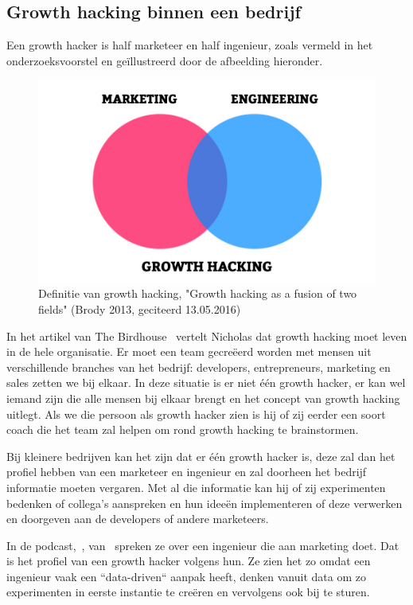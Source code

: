 \subsection{Growth hacking binnen een bedrijf} \label{sec:growth-hacker-functie}
Een growth hacker is half marketeer en half ingenieur, zoals vermeld in het onderzoeksvoorstel en geïllustreerd door de afbeelding hieronder.
\begin{figure}[h!]
	\includegraphics[width=\linewidth]{img/growth-hacker-definition.jpg}
	\centering
	\caption{Definitie van growth hacking, "Growth hacking as a fusion of two fields"  (Brody 2013, geciteerd 13.05.2016)}
	\label{fig:defGrowthHacker}
\end{figure}

In het artikel van The Birdhouse~ vertelt Nicholas dat growth hacking moet leven in de hele organisatie. Er moet een team gecreëerd worden met mensen uit verschillende branches van het bedrijf: developers, entrepreneurs, marketing en sales zetten we bij elkaar. In deze situatie is er niet één growth hacker, er kan wel iemand zijn die alle mensen bij elkaar brengt en het concept van growth hacking uitlegt. Als we die persoon als growth hacker zien is hij of zij eerder een soort coach die het team zal helpen om rond growth hacking te brainstormen.

Bij kleinere bedrijven kan het zijn dat er één growth hacker is, deze zal dan het profiel hebben van een marketeer en ingenieur en zal doorheen het bedrijf informatie moeten vergaren. Met al die informatie kan hij of zij experimenten bedenken of collega's aanspreken en hun ideeën implementeren of deze verwerken en doorgeven aan de developers of andere marketeers. 

In de podcast,~, van~\autocite{fizzle.co2015} spreken ze over een ingenieur die aan marketing doet. Dat is het profiel van een growth hacker volgens hun. Ze zien het zo omdat een ingenieur vaak een ``data-driven`` aanpak heeft, denken vanuit data om zo experimenten in eerste instantie te creëren en vervolgens ook bij te sturen. 

